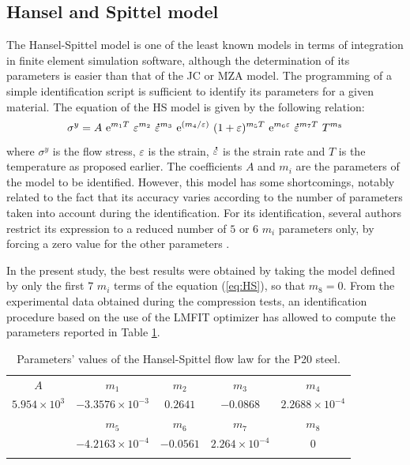 \documentclass[twoside,english,1p,final,sort&compress]{elsarticle}
\theoremstyle{plain}
\DeclareRobustCommand{\e}[1]{{\rm e}^{#1}}
\DeclareRobustCommand{\mdot}[1]{\accentset{\mbox{\bfseries .}}{#1}}
\begin{document}
\subsection{Hansel and Spittel model\label{sec:HSmodel}}

The Hansel-Spittel model \cite{Hensel-1978} is one of the least known models in terms of integration in finite element simulation software, although the determination of its parameters is easier than that of the JC or MZA model.
The programming of a simple identification script is sufficient to identify its parameters for a given material.
The equation of the HS model is given by the following relation:
\begin{equation}
\sigma^y = A~\e{m_1T}~\varepsilon^{m_2}~\mdot\varepsilon^{m_3}~\e{({m_4}/{\varepsilon})}~(1+\varepsilon)^{m_5T}~\e{m_6\varepsilon}~\mdot\varepsilon^{m_7T}~T^{m_8} \label{eq:HS}
\end{equation}
where $\sigma^y$ is the flow stress, $\varepsilon$ is the strain, $\mdot\varepsilon$ is the strain rate and $T$ is the temperature as proposed earlier.
The coefficients $A$ and $m_i$ are the parameters of the model to be identified.
However, this model has some shortcomings, notably related to the fact that its accuracy varies according to the number of parameters taken into account during the identification.
For its identification, several authors restrict its expression to a reduced number of $5$ or $6$ $m_i$ parameters only, by forcing a zero value for the other parameters \cite{Chadha-2018, Rudnytskyj-2020, Mehtedi-2015}.

In the present study, the best results were obtained by taking the model defined by only the first $7$ $m_i$ terms of the equation (\ref{eq:HS}), so that $m_8=0$.
From the experimental data obtained during the compression tests, an identification procedure based on the use of the LMFIT optimizer \cite{Newville-2016} has allowed to compute the parameters reported in Table \ref{tab:HS}.

\begin{table}[h!]
\centering
\caption{Parameters' values of the Hansel-Spittel flow law for the P20 steel.}
\begin{tabular}{ccccc}
\hline
$A$ & $m_1$ & $m_2$ & $m_3$ & $m_4$\\
$5.954\times 10^{3}$ & $-3.3576\times10^{-3}$ & $0.2641$ & $-0.0868$ & $2.2688\times10^{-4}$\\\hline
& $m_5$ & $m_6$ & $m_7$ & $m_8$\\
& $-4.2163\times10^{-4}$ & $-0.0561$ & $2.264\times10^{-4}$ & $0$\\\hline
\label{tab:HS}
\end{tabular}
\end{table}
\end{document}
